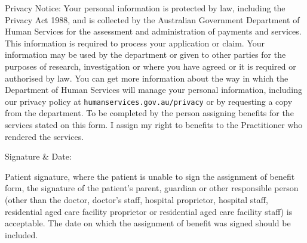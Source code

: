 \documentclass[12pt]{article}
\begin{document}
\vspace{3mm}

\begin{spacing}{0.3}

{\tiny
Privacy Notice: Your personal information is protected by law, including the Privacy Act 1988, and is collected by the Australian Government Department of Human Services for the assessment and administration of payments and services. This information is required to process your application or claim. 
Your information may be used by the department or given to other parties for the purposes of research, investigation or where you have agreed or it is required or authorised by law. 
You can get more information about the way in which the Department of Human Services will manage your personal information, including our privacy policy at \texttt{humanservices.gov.au/privacy} or by requesting a copy from the department. 
To be completed by the person assigning benefits for the services stated on this form. I assign my right to benefits to the Practitioner who rendered the services. }

\vspace{7mm}

Signature \& Date:

\vspace{1.5cm}



{\tiny Patient signature, where the patient is unable to sign the assignment of benefit form, the signature of the patient's parent, guardian or other responsible person (other than the doctor, doctor's staff, hospital proprietor, hospital staff, residential aged care facility proprietor or residential aged care facility staff) is acceptable. 
The date on which the assignment of benefit was signed should be included.}

                            \end{spacing}
\end{document}

